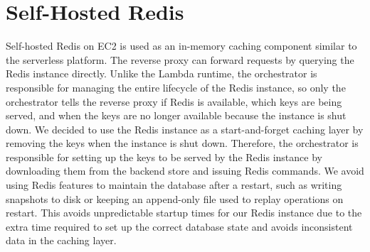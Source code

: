 \section{Self-Hosted Redis}
\label{sec:self_hosted_redis}
Self-hosted Redis on EC2 is used as an in-memory caching component similar to the serverless platform. The reverse proxy can forward requests by querying the Redis instance directly. Unlike the Lambda runtime, the orchestrator is responsible for managing the entire lifecycle of the Redis instance, so only the orchestrator tells the reverse proxy if Redis is available, which keys are being served, and when the keys are no longer available because the instance is shut down. We decided to use the Redis instance as a start-and-forget caching layer by removing the keys when the instance is shut down. Therefore, the orchestrator is responsible for setting up the keys to be served by the Redis instance by downloading them from the backend store and issuing Redis commands. We avoid using Redis features to maintain the database after a restart, such as writing snapshots to disk or keeping an append-only file used to replay operations on restart. This avoids unpredictable startup times for our Redis instance due to the extra time required to set up the correct database state and avoids inconsistent data in the caching layer.